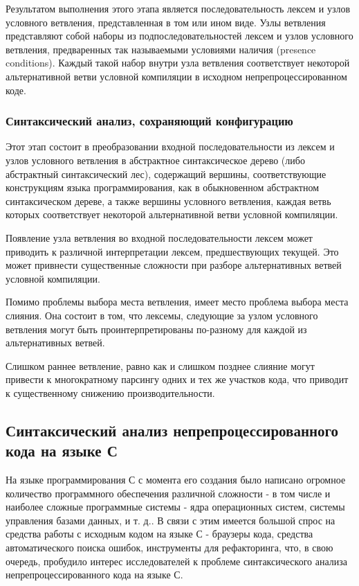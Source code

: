 Результатом выполнения этого этапа является последовательность лексем и узлов условного ветвления, представленная в том или ином виде. Узлы ветвления представляют собой наборы из подпоследовательностей лексем и узлов условного ветвления, предваренных так называемыми условиями наличия (presence conditions). Каждый такой набор внутри узла ветвления соответствует некоторой альтернативной ветви условной компиляции в исходном непрепроцессированном коде.

\subsubsection{Синтаксический анализ, сохраняющий конфигурацию}

Этот этап состоит в преобразовании входной последовательности из лексем и узлов условного ветвления в абстрактное синтаксическое дерево (либо абстрактный синтаксический лес), содержащий вершины, соответствующие конструкциям языка программирования, как в обыкновенном абстрактном синтаксическом дереве, а также вершины условного ветвления, каждая ветвь которых соответствует некоторой альтернативной ветви условной компиляции.

Появление узла ветвления во входной последовательности лексем может приводить к различной интерпретации лексем, предшествующих текущей.  Это может привнести существенные сложности при разборе альтернативных ветвей условной компиляции.

Помимо проблемы выбора места ветвления, имеет место проблема выбора места слияния. Она состоит в том, что лексемы, следующие за узлом условного ветвления могут быть проинтерпретированы по-разному для каждой из альтернативных ветвей.

Слишком раннее ветвление, равно как и слишком позднее слияние могут привести к многократному парсингу одних и тех же участков кода, что приводит к существенному снижению производительности.

\subsection{Синтаксический анализ непрепроцессированного кода на языке С}

На языке программирования С с момента его создания было написано огромное количество программного обеспечения различной сложности - в том числе и наиболее сложные программные системы - ядра операционных систем, системы управления базами данных, и т. д.. В связи с этим имеется большой спрос на средства работы с исходным кодом на языке С - браузеры кода, средства автоматического поиска ошибок, инструменты для рефакторинга, что, в свою очередь, пробудило интерес исследователей к проблеме синтаксического анализа непрепроцессированного кода на языке С.


